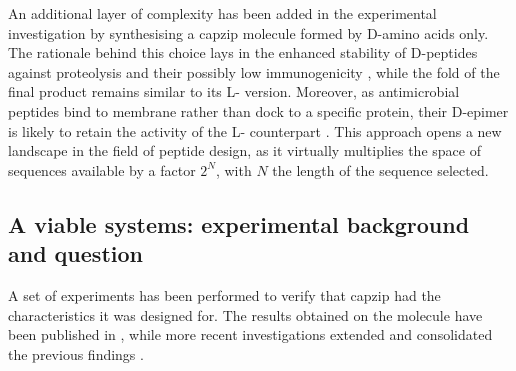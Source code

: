 An additional layer of complexity has been added in the experimental investigation by synthesising a capzip molecule formed by D-amino acids only. The rationale behind this choice lays in the enhanced stability of D-peptides against proteolysis and their possibly low immunogenicity \citep{Uppalapati2016,Arranz-Gibert2018,King1994}, while the fold of the final product remains similar to its L- version.
%
Moreover, as antimicrobial peptides bind to membrane rather than dock to a specific protein, their D-epimer is likely to retain the activity of the L- counterpart \citep{King1994,Bland2001}.
%
This approach opens a new landscape in the field of peptide design, as it virtually multiplies the space of sequences available by a factor $2^N$, with $N$ the length of the sequence selected.


\subsection{A viable systems: experimental background and question}
A set of experiments has been performed to verify that capzip had the characteristics it was designed for. The results obtained on the molecule have been published in \citet{Castelletto2016}, while more recent investigations extended and consolidated the previous findings \citep{Kepiro2019}.

